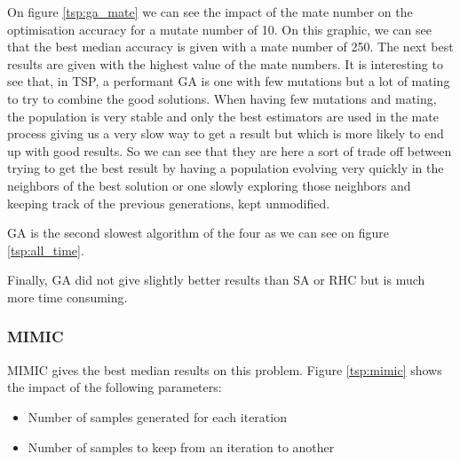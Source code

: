\documentclass[10pt]{article}
\begin{document}
				On figure \ref{tsp:ga_mate} we can see the impact of the mate number on the optimisation accuracy for a mutate number of 10. On this graphic, we can see that the best median accuracy is given with a mate number of 250. The next best results are given with the highest value of the mate numbers. It is interesting to see that, in TSP, a performant GA is one with few mutations but a lot of mating to try to combine the good solutions.
				When having few mutations and mating, the population is very stable and only the best estimators are used in the mate process giving us a very slow way to get a result but which is more likely to end up with good results. So we can see that they are here a sort of trade off between trying to get the best result by having a population evolving very quickly in the neighbors of the best solution or one slowly exploring those neighbors and keeping track of the previous generations, kept unmodified.

				GA is the second slowest algorithm of the four as we can see on figure \ref{tsp:all_time}.

				Finally, GA did not give slightly better results than SA or RHC but is much more time consuming.
			\subsubsection*{MIMIC}
				MIMIC gives the best median results on this problem. Figure \ref{tsp:mimic} shows the impact of the following parameters:
				\begin{itemize}
					\item Number of samples generated for each iteration
					\item Number of samples to keep from an iteration to another
				\end{itemize}
\end{document}
